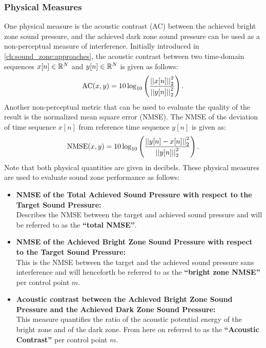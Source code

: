 \subsubsection{Physical Measures}
One physical measure is the acoustic contrast (AC) between the 
achieved bright zone sound pressure, and the achieved dark zone sound pressure can be used as a non-perceptual measure of interference.
Initially introduced in \autoref{ch:sound_zone:approaches}, 
the acoustic contrast between two time-domain sequences $x[n]\in\mathbb{R}^{N}$
and $y[n]\in\mathbb{R}^{N}$ is given as follows: 
\begin{equation}
    \mathrm{AC}(x,y) = 10\log_{10}\left(\frac{\norm[2][2]{x[n]}}{\norm[2][2]{y[n]}}\right).
\end{equation}
Another non-perceptual metric that can be used to evaluate the quality of the result is the normalized mean square error (NMSE).
The NMSE of the deviation of time sequence $x[n]$ from reference time sequence $y[n]$ is given as:
\begin{equation}
    \text{NMSE}(x,y) = 10\log_{10}\left(\frac{\norm[2][2]{y[n] - x[n]}}{\norm[2][2]{y[n]}}\right).
\end{equation}
Note that both physical quantities are given in decibels.
These physical measures are used to evaluate sound zone performance as follows:
\begin{itemize}
    \item \textbf{NMSE of the Total Achieved Sound Pressure with respect to the Target Sound Pressure:}\\
        Describes the NMSE between the target and achieved sound pressure and will be referred to as the 
        \textbf{``total NMSE''}.
    \item \textbf{NMSE of the Achieved Bright Zone Sound Pressure with respect to the Target Sound Pressure:}\\
        This is the NMSE between the target and the achieved sound pressure sans interference and will henceforth be referred to as the \textbf{``bright zone NMSE''} per control point $m$.
    \item \textbf{Acoustic contrast between the Achieved Bright Zone Sound Pressure and the 
        Achieved Dark Zone Sound Pressure:}\\
        This measure quantifies the ratio of the acoustic potential energy of the bright zone and of the dark zone.
        From here on referred to as the \textbf{``Acoustic Contrast''} per control point $m$.
\end{itemize}
